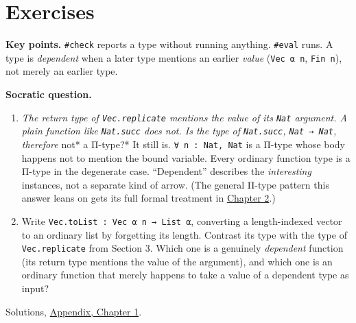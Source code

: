 \section{Exercises}\label{sec:01-basics:04-exercises:1}

\textbf{Key points.} \texttt{\#check} reports a type without running anything. \texttt{\#eval} runs. A type is \emph{dependent} when a later type mentions an earlier \emph{value} (\texttt{Vec α n}, \texttt{Fin n}), not merely an earlier type.

\textbf{Socratic question.}

\begin{enumerate}
\def\labelenumi{\arabic{enumi}.}
\item
  \emph{The return type of \texttt{Vec.replicate} mentions the value of its \texttt{Nat} argument. A plain function like \texttt{Nat.succ} does not. Is the type of \texttt{Nat.succ}, \texttt{Nat → Nat}, therefore }not* a Π-type?* It still is. \texttt{∀ n : Nat, Nat} is a Π-type whose body happens not to mention the bound variable. Every ordinary function type is a Π-type in the degenerate case. ``Dependent'' describes the \emph{interesting} instances, not a separate kind of arrow. (The general Π-type pattern this answer leans on gets its full formal treatment in \hyperref[sec:02-terminology-and-coc:00-index:1]{Chapter 2}.)
\item
  Write \texttt{Vec.toList : Vec α n → List α}, converting a length-indexed vector to an ordinary list by forgetting its length. Contrast its type with the type of \texttt{Vec.replicate} from Section 3. Which one is a genuinely \emph{dependent} function (its return type mentions the value of the argument), and which one is an ordinary function that merely happens to take a value of a dependent type as input?
\end{enumerate}

Solutions, \hyperref[sec:15-appendix-solutions:01-chapter-1:1]{Appendix, Chapter 1}.
